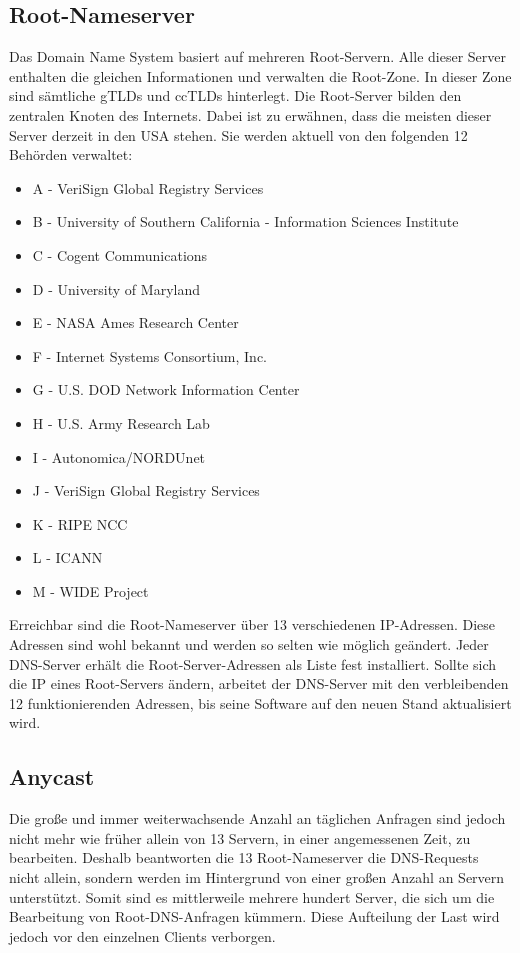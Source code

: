 \subsection{Root-Nameserver}
Das Domain Name System basiert auf mehreren Root-Servern. Alle dieser Server enthalten die gleichen Informationen und verwalten die Root-Zone. In dieser Zone sind sämtliche gTLDs und ccTLDs hinterlegt. Die Root-Server bilden den zentralen Knoten des Internets. Dabei ist zu erwähnen, dass die meisten dieser Server derzeit in den USA stehen. Sie werden aktuell von den folgenden 12 Behörden verwaltet:
\begin{itemize}
    \item A - VeriSign Global Registry Services
    \item B - University of Southern California - Information Sciences Institute
    \item C - Cogent Communications
    \item D - University of Maryland
    \item E - NASA Ames Research Center
    \item F - Internet Systems Consortium, Inc.
    \item G - U.S. DOD Network Information Center
    \item H - U.S. Army Research Lab
    \item I - Autonomica/NORDUnet
    \item J - VeriSign Global Registry Services
    \item K - RIPE NCC
    \item L - ICANN
    \item M - WIDE Project
\end{itemize}

Erreichbar sind die Root-Nameserver über 13 verschiedenen IP-Adressen. Diese Adressen sind wohl bekannt und werden so selten wie möglich geändert. Jeder DNS-Server erhält die Root-Server-Adressen als Liste fest installiert. Sollte sich die IP eines Root-Servers ändern, arbeitet der DNS-Server mit den verbleibenden 12 funktionierenden Adressen, bis seine Software auf den neuen Stand aktualisiert wird. \cite{NETNOD.2018}

\subsection{Anycast}
Die große und immer weiterwachsende Anzahl an täglichen Anfragen sind jedoch nicht mehr wie früher allein von 13 Servern, in einer angemessenen Zeit, zu bearbeiten. Deshalb beantworten die 13 Root-Nameserver die DNS-Requests nicht allein, sondern werden im Hintergrund von einer großen Anzahl an Servern unterstützt. Somit sind es mittlerweile mehrere hundert Server, die sich um die Bearbeitung von Root-DNS-Anfragen kümmern. Diese Aufteilung der Last wird jedoch vor den einzelnen Clients verborgen.


